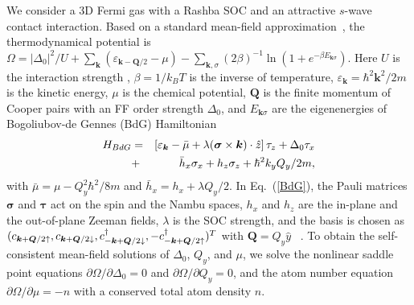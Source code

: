 \documentclass[prl,aps,twocolumn,showpacs,floatfix]{revtex4}
\begin{document}
We consider a 3D Fermi gas with a Rashba SOC and an attractive $s$-wave
contact interaction. Based on a standard mean-field approximation~\cite%
{Lin2013NJP}, the thermodynamical potential is $\Omega =|\Delta
_{0}|^{2}/U+\sum\nolimits_{\bm{k}}\left( \varepsilon _{{\bm k}-{\bm Q}%
/2}-\mu \right) -\sum\nolimits_{\bm{k},\sigma }(2\beta )^{-1}\ln
(1+e^{-\beta E_{\bm{k}\sigma }})$. Here $U$ is the interaction strength \cite%
{StringariRMP}, $\beta =1/k_{B}T$ is the inverse of temperature, $%
\varepsilon _{\bm k}={\hbar ^{2}\mathbf{k}^{2}}/{2m}$ is the kinetic energy,
$\mu $ is the chemical potential, $\bm Q$ is the finite momentum of Cooper
pairs with an FF order strength $\Delta _{0}$, and $E_{\mathbf{k}\sigma }$
are the eigenenergies of Bogoliubov-de Gennes (BdG) Hamiltonian
\begin{eqnarray}
H_{BdG} &=&\left[ \varepsilon _{\bm k}-\bar{\mu}+\lambda ({\bm\sigma }\times
{\bm k})\cdot \hat{z}\right] \tau _{z}+\Delta _{0}\tau _{x}  \notag \\
&+&\bar{h}_{x}\sigma _{x}+h_{z}\sigma _{z}+{\hbar ^{2}k_{y}Q_{y}}/{2m},
\label{BdG}
\end{eqnarray}%
with $\bar{\mu}=\mu -Q_{y}^{2}\hbar ^{2}/8m$ and $\bar{h}_{x}=h_{x}+\lambda
Q_{y}/2$. In Eq.~(\ref{BdG}), the Pauli matrices $\bm\sigma $ and $\bm\tau $
act on the spin and the Nambu spaces, $h_{x}$ and $h_{z}$ are the in-plane
and the out-of-plane Zeeman fields, $\lambda $ is the SOC strength, and the
basis is chosen as $(c_{{\bm k}+{\bm Q}/2\uparrow },c_{{\bm k}+{\bm Q}%
/2\downarrow },c_{-{\bm k}+{\bm Q}/2\downarrow }^{\dagger },-c_{-{\bm k}+{%
\bm
Q}/2\uparrow }^{\dagger })^{T}$ with $\bm{Q}=Q_{y}\hat{y}$ ~\cite%
{Zheng2013PRA,Yong2014PRA}. To obtain the self-consistent mean-field
solutions of $\Delta _{0}$, $Q_{y}$, and $\mu $, we solve the nonlinear
saddle point equations $\partial \Omega /\partial \Delta _{0}=0$ and $%
\partial \Omega /\partial Q_{y}=0$, and the atom number equation $\partial
\Omega /\partial \mu =-n$ with a conserved total atom density $n$.
\end{document}
